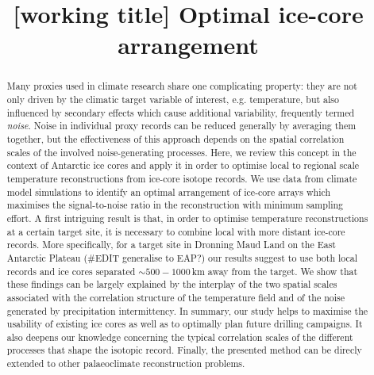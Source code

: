 \documentclass[cp, manuscript]{copernicus}
\begin{document}
\title{[working title] Optimal ice-core arrangement}




\received{}
\pubdiscuss{}
\revised{}
\accepted{}
\published{}


\maketitle

\begin{abstract} Many proxies used in climate research share one complicating
property: they are not only driven by the climatic target variable of interest,
e.g. temperature, but also influenced by secondary effects which cause
additional variability, frequently termed \emph{noise}. Noise in individual
proxy records can be reduced generally by averaging them together, but the
effectiveness of this approach depends on the spatial correlation scales of the
involved noise-generating processes. Here, we review this concept in the context
of Antarctic ice cores and apply it in order to optimise local to regional scale
temperature reconstructions from ice-core isotope records. We use data from
climate model simulations to identify an optimal arrangement of ice-core arrays
which maximises the signal-to-noise ratio in the reconstruction with minimum
sampling effort. A first intriguing result is that, in order to optimise
temperature reconstructions at a certain target site, it is necessary to combine
local with more distant ice-core records. More specifically, for a target site
in Dronning Maud Land on the East Antarctic Plateau (\#EDIT generalise to EAP?)
our results suggest to use both local records and ice cores separated
$\sim500-1000$\,km away from the target. We show that these findings can be
largely explained by the interplay of the two spatial scales associated with the
correlation structure of the temperature field and of the noise generated by
precipitation intermittency. In summary, our study helps to maximise the
usability of existing ice cores as well as to optimally plan future drilling
campaigns. It also deepens our knowledge concerning the typical correlation
scales of the different processes that shape the isotopic record. Finally, the
presented method can be direcly extended to other palaeoclimate reconstruction
problems.
\end{abstract}
\end{document}
